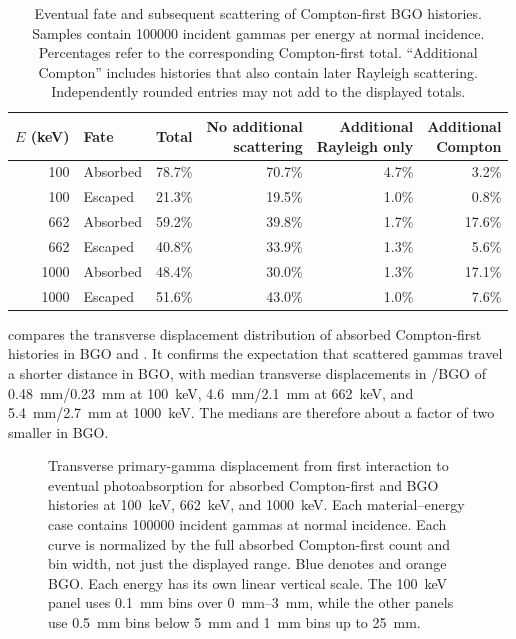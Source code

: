 \begin{table}[htbp]
\centering\small
\caption{Eventual fate and subsequent scattering of Compton-first BGO histories. Samples contain \num{100000} incident gammas per energy at normal incidence. Percentages refer to the corresponding Compton-first total. ``Additional Compton'' includes histories that also contain later Rayleigh scattering. Independently rounded entries may not add to the displayed totals.}
\label{tab:material-compton-fates}
\begin{tabular}{rlrrrr}
\toprule
$E$ (\unit{\kilo\electronvolt}) & Fate & Total & \shortstack{No additional\\scattering} & \shortstack{Additional\\Rayleigh only} & \shortstack{Additional\\Compton} \\
\midrule
100 & Absorbed & 78.7\% & 70.7\% & 4.7\% & 3.2\% \\
100 & Escaped & 21.3\% & 19.5\% & 1.0\% & 0.8\% \\
662 & Absorbed & 59.2\% & 39.8\% & 1.7\% & 17.6\% \\
662 & Escaped & 40.8\% & 33.9\% & 1.3\% & 5.6\% \\
1000 & Absorbed & 48.4\% & 30.0\% & 1.3\% & 17.1\% \\
1000 & Escaped & 51.6\% & 43.0\% & 1.0\% & 7.6\% \\
\bottomrule
\end{tabular}
\end{table}

 compares the transverse displacement distribution of absorbed Compton-first histories in BGO and . It confirms the expectation that scattered gammas travel a shorter distance in BGO, with median transverse displacements in /BGO of \qty{0.48}{\milli\metre}/\qty{0.23}{\milli\metre} at \qty{100}{\kilo\electronvolt}, \qty{4.6}{\milli\metre}/\qty{2.1}{\milli\metre} at \qty{662}{\kilo\electronvolt}, and \qty{5.4}{\milli\metre}/\qty{2.7}{\milli\metre} at \qty{1000}{\kilo\electronvolt}. The medians are therefore about a factor of two smaller in BGO.



\begin{figure}[!htbp]
  \captionsetup{font=small}
  \centering
  \caption{Transverse primary-gamma displacement from first interaction to eventual photoabsorption for absorbed Compton-first  and BGO histories at \qty{100}{\kilo\electronvolt}, \qty{662}{\kilo\electronvolt}, and \qty{1000}{\kilo\electronvolt}. Each material--energy case contains \num{100000} incident gammas at normal incidence. Each curve is normalized by the full absorbed Compton-first count and bin width, not just the displayed range. Blue denotes  and orange BGO. Each energy has its own linear vertical scale. The \qty{100}{\kilo\electronvolt} panel uses \qty{0.1}{\milli\metre} bins over \qtyrange{0}{3}{\milli\metre}, while the other panels use \qty{0.5}{\milli\metre} bins below \qty{5}{\milli\metre} and \qty{1}{\milli\metre} bins up to \qty{25}{\milli\metre}.}
  \label{fig:material-displacements}
\end{figure}

